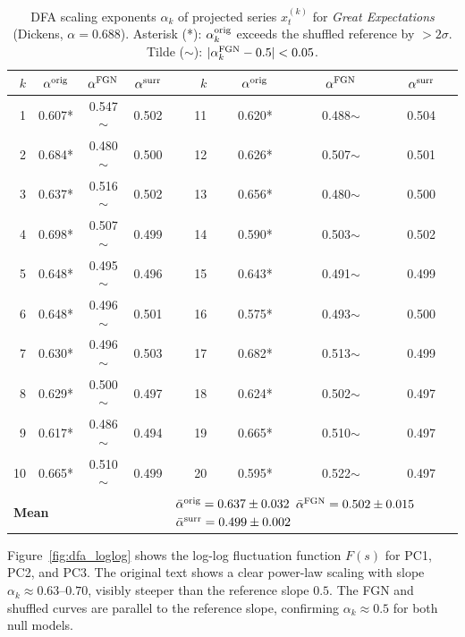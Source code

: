 \documentclass[12pt,a4paper]{article}
\begin{document}
\begin{table}[htbp]
\centering
\caption{DFA scaling exponents $\alpha_k$ of projected series
$x_t^{(k)}$ for \emph{Great Expectations} (Dickens, $\alpha=0.688$).
Asterisk (*): $\alpha_k^{\rm orig}$ exceeds the shuffled
reference by $>2\sigma$.
Tilde ($\sim$): $|\alpha_k^{\rm FGN} - 0.5| < 0.05$.}
\label{tab:dfa_proj}
\scriptsize
\setlength{\tabcolsep}{4pt}
\begin{tabular}{r ccc r ccc}
\toprule
$k$ & $\alpha^{\rm orig}$ & $\alpha^{\rm FGN}$ &
    $\alpha^{\rm surr}$ &
$k$ & $\alpha^{\rm orig}$ & $\alpha^{\rm FGN}$ &
    $\alpha^{\rm surr}$ \\
\midrule
 1 & 0.607* & 0.547$\sim$ & 0.502 &
11 & 0.620* & 0.488$\sim$ & 0.504 \\
 2 & 0.684* & 0.480$\sim$ & 0.500 &
12 & 0.626* & 0.507$\sim$ & 0.501 \\
 3 & 0.637* & 0.516$\sim$ & 0.502 &
13 & 0.656* & 0.480$\sim$ & 0.500 \\
 4 & 0.698* & 0.507$\sim$ & 0.499 &
14 & 0.590* & 0.503$\sim$ & 0.502 \\
 5 & 0.648* & 0.495$\sim$ & 0.496 &
15 & 0.643* & 0.491$\sim$ & 0.499 \\
 6 & 0.648* & 0.496$\sim$ & 0.501 &
16 & 0.575* & 0.493$\sim$ & 0.500 \\
 7 & 0.630* & 0.496$\sim$ & 0.503 &
17 & 0.682* & 0.513$\sim$ & 0.499 \\
 8 & 0.629* & 0.500$\sim$ & 0.497 &
18 & 0.624* & 0.502$\sim$ & 0.497 \\
 9 & 0.617* & 0.486$\sim$ & 0.494 &
19 & 0.665* & 0.510$\sim$ & 0.497 \\
10 & 0.665* & 0.510$\sim$ & 0.499 &
20 & 0.595* & 0.522$\sim$ & 0.497 \\
\midrule
\multicolumn{4}{l}{\textbf{Mean}} &
\multicolumn{4}{l}{$\bar\alpha^{\rm orig}=0.637\pm0.032$ \quad
                   $\bar\alpha^{\rm FGN}=0.502\pm0.015$ \quad
                   $\bar\alpha^{\rm surr}=0.499\pm0.002$}\\
\bottomrule
\end{tabular}
\end{table}

Figure~\ref{fig:dfa_loglog} shows the log-log fluctuation
function $F(s)$ for PC1, PC2, and PC3.
The original text shows a clear power-law scaling with
slope $\alpha_k \approx 0.63$--$0.70$, visibly steeper than
the reference slope $0.5$.
The FGN and shuffled curves are parallel to the reference slope,
confirming $\alpha_k \approx 0.5$ for both null models.
\end{document}

